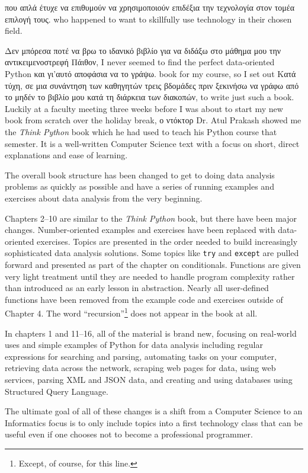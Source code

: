 που απλά έτυχε να επιθυμούν να χρησιμοποιούν επιδέξια την τεχνολογία στον τομέα επιλογή τους.
who happened to want to skillfully use technology in their chosen field.

Δεν μπόρεσα ποτέ να βρω το ιδανικό βιβλίο για να διδάξω στο μάθημα μου την αντικειμενοστρεφή Πάιθον,
I never seemed to find the perfect data-oriented Python
και γι'αυτό αποφάσια να το γράψω.
book for my course, so I set out 
Κατά τύχη, σε μια συνάντηση των καθηγητών τρεις βδομάδες πριν ξεκινήσω να γράφω από το μηδέν το βιβλίο μου κατά τη διάρκεια των διακοπών, 
to write just such a book.  Luckily at a faculty meeting three weeks
before I was about to start my new book from scratch over 
the holiday break, 
ο ντόκτορ 
Dr. Atul Prakash showed me the \emph{Think Python} book which he had
used to teach his Python course that semester.  
It is a well-written Computer Science text with a focus on 
short, direct explanations and ease of learning.  

The overall book structure
has been changed to get to doing data analysis problems as quickly as
possible and have a series of running examples and exercises 
about data analysis from the very beginning.  

Chapters 2--10 are similar to the \emph{Think Python} book,
but there have been major changes. Number-oriented examples and
exercises have been replaced with data-oriented exercises.
Topics are presented in the order needed to build increasingly
sophisticated data analysis solutions. Some topics like {\tt try} and
{\tt except} are pulled forward and presented as part of the chapter
on conditionals.  Functions are given very light treatment until 
they are needed to handle program complexity rather than introduced 
as an early lesson in abstraction.  Nearly all user-defined functions
have been removed from the example code and exercises outside of Chapter 4.
The word ``recursion''\footnote{Except, of course, for this line.}
does not appear in the book at all.

In chapters 1 and 11--16, all of the material is brand new, focusing
on real-world uses and simple examples of Python for data analysis 
including regular expressions for searching and parsing, 
automating tasks on your computer, retrieving data across 
the network, scraping web pages for data, 
using web services, parsing XML and JSON data, and creating 
and using databases using Structured Query Language.

The ultimate goal of all of these changes is a shift from a 
Computer Science to an Informatics
focus is to only include topics into a first technology 
class that can be useful even if one chooses not to 
become a professional programmer.

